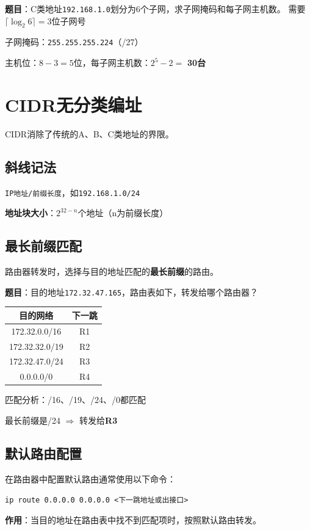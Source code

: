 \begin{examplebox}[例题4.1 子网划分]
\textbf{题目}：C类地址\texttt{192.168.1.0}划分为6个子网，求子网掩码和每子网主机数。
\tcblower
需要$\lceil\log_2 6\rceil = 3$位子网号

子网掩码：\texttt{255.255.255.224}（/27）

主机位：$8-3=5$位，每子网主机数：$2^5-2=$ \textbf{30台}
\end{examplebox}

\section{CIDR无分类编址}
CIDR消除了传统的A、B、C类地址的界限。

\subsection{斜线记法}
\texttt{IP地址/前缀长度}，如\texttt{192.168.1.0/24}

\textbf{地址块大小}：$2^{32-n}$个地址（n为前缀长度）

\subsection{最长前缀匹配}
路由器转发时，选择与目的地址匹配的\textbf{最长前缀}的路由。

\begin{examplebox}[例题4.2 最长前缀匹配]
\textbf{题目}：目的地址\texttt{172.32.47.165}，路由表如下，转发给哪个路由器？
\begin{center}\small
\begin{tabular}{|c|c|}
\hline
目的网络 & 下一跳 \\
\hline
172.32.0.0/16 & R1 \\
172.32.32.0/19 & R2 \\
172.32.47.0/24 & R3 \\
0.0.0.0/0 & R4 \\
\hline
\end{tabular}
\end{center}
\tcblower
匹配分析：/16、/19、/24、/0都匹配

最长前缀是/24 $\Rightarrow$ 转发给\textbf{R3}
\end{examplebox}

\subsection{默认路由配置}
在路由器中配置默认路由通常使用以下命令：
\begin{center}
\texttt{ip route 0.0.0.0 0.0.0.0 <下一跳地址或出接口>}
\end{center}
\textbf{作用}：当目的地址在路由表中找不到匹配项时，按照默认路由转发。


